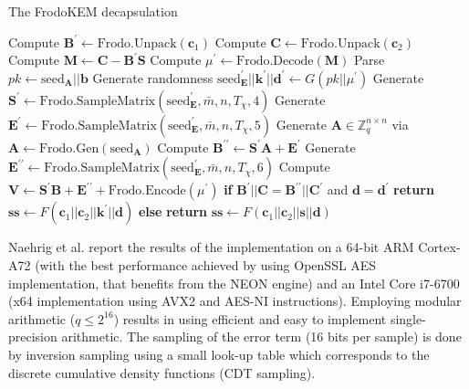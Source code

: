\begin{algorithm}
\caption{The \textsf{FrodoKEM} decapsulation} \label{alg:decaps}
   \begin{flushleft}

  \begin{algorithmic}[1]
        \State Compute $\mathbf{B}^\prime \leftarrow \text{Frodo.Unpack}(\mathbf{c}_1)$
        \State Compute $\mathbf{C} \leftarrow \text{Frodo.Unpack}(\mathbf{c}_2)$
        \State Compute $\mathbf{M} \leftarrow \mathbf{C} - \mathbf{B}^\prime \mathbf{S}$        
        \State Compute $\mu^\prime \leftarrow \text{Frodo.Decode}(\mathbf{M})$   
        \State Parse $pk \leftarrow \text{seed}_\mathbf{A} || \mathbf{b}$
        \State Generate randomness $\text{seed}^\prime_\mathbf{E} || \mathbf{k}^\prime ||\mathbf{d}^\prime \leftarrow G(pk || \mu^\prime)$       
       \State Generate $\mathbf{S}^\prime \leftarrow \text{Frodo.SampleMatrix}(\text{seed}^\prime _\mathbf{E},\bar{m},n,T_\chi,4)$
       \State Generate $\mathbf{E}^\prime \leftarrow \text{Frodo.SampleMatrix}(\text{seed}^\prime _\mathbf{E},\bar{m},n,T_\chi,5)$
        \State Generate $\mathbf{A} \in \mathbb{Z}^{n \times n}_{q}$ via $\mathbf{A} \leftarrow \text{Frodo.Gen}(\text{seed}_\mathbf{A})$
        \State Compute $\mathbf{B}^{\prime\prime} \leftarrow \mathbf{S}^\prime \mathbf{A} + \mathbf{E}^\prime$ \label{decapslwe}
        \State Generate $\mathbf{E}^{\prime\prime} \leftarrow \text{Frodo.SampleMatrix}(\text{seed}^\prime_\mathbf{E},\bar{m},n,T_\chi,6    )$
        \State Compute $\mathbf{V} \leftarrow \mathbf{S}^\prime \mathbf{B} + \mathbf{E} ^{\prime\prime} + \text{Frodo.Encode}(\mu^\prime)$
\State \textbf{if} $ \mathbf{B}^\prime || \mathbf{C} = \mathbf{B}^{\prime\prime} || \mathbf{C}^\prime$ and $\mathbf{d} = \mathbf{d}^\prime $ \textbf{return} $\mathbf{ss} \leftarrow F(\mathbf{c}_1 || \mathbf{c}_2 || \mathbf{k}^\prime || \mathbf{d})$
	 \State \textbf{else} \textbf{return} $\mathbf{ss} \leftarrow F(\mathbf{c}_1 || \mathbf{c}_2 || \mathbf{s} || \mathbf{d})$
    \EndProcedure
\end{algorithmic}
    \end{flushleft}

 \end{algorithm}

Naehrig et al. \cite{frodokem} report the results of the implementation on a 64-bit ARM Cortex-A72 (with the best performance achieved by using OpenSSL AES implementation, that benefits from the NEON engine) and an Intel Core i7-6700 (x64 implementation using AVX2 and AES-NI instructions). Employing modular arithmetic ($q \leq 2^{16}$) results in using efficient and easy to implement single-precision arithmetic. The sampling of the error term (16 bits per sample) is done by inversion sampling using a small look-up table which corresponds to the discrete cumulative density functions (CDT sampling).

